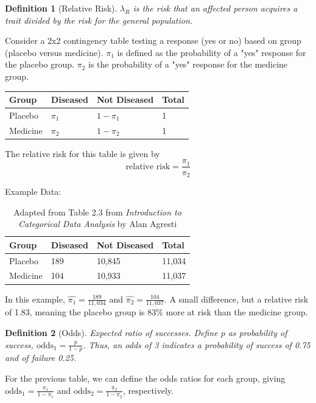 \documentclass{tufte-handout}
\theoremstyle{noparens}
\newtheorem*{define}{Definition}
\begin{document}
\begin{define}[Relative Risk]
$\lambda_R$ is the risk that an affected person acquires a trait divided by the risk for the general population.
\end{define}

Consider a 2x2 contingency table testing a response (yes or no) based on group (placebo versus medicine). $\pi_1$ is defined as the probability of a "yes" response for the placebo group. $\pi_2$ is the probability of a "yes" response for the medicine group.

\begin{table}
\centering
\begin{tabular}{llll}
\toprule
Group & Diseased & Not Diseased & Total\\
\midrule
Placebo & $\pi_1$ & $1-\pi_1$ & 1\\
Medicine & $\pi_2$ & $1-\pi_2$ & 1\\
\bottomrule
\end{tabular}
\end{table}

The relative risk for this table is given by \[ \text{relative risk} = \frac{\pi_1}{\pi_2} \]

Example Data:

\begin{table}
\centering
\begin{tabular}{llll}
\toprule
Group & Diseased & Not Diseased & Total\\
\midrule
Placebo & 189 & 10,845 & 11,034\\
Medicine & 104 & 10,933 & 11,037\\
\bottomrule
\end{tabular}
\caption{Adapted from Table 2.3 from \emph{Introduction to Categorical Data Analysis} by Alan Agresti}
\end{table}

In this example, $\hat{\pi_1} = \frac{189}{11,034}$ and $\hat{\pi_2} = \frac{104}{11,037}$. A small difference, but a relative risk of 1.83, meaning the placebo group is 83\% more at risk than the medicine group.

\begin{define}[Odds]
Expected ratio of successes. Define $p$ as probability of success, $\text{odds}_1 = \frac{p}{1-p}$. Thus, an odds of 3 indicates a probability of success of 0.75 and of failure 0.25.
\end{define}

For the previous table, we can define the odds ratios for each group, giving $\text{odds}_1 = \frac{\pi_1}{1-\pi_1}$ and $\text{odds}_2 = \frac{\pi_2}{1-\pi_2}$, respectively. 
\end{document}

